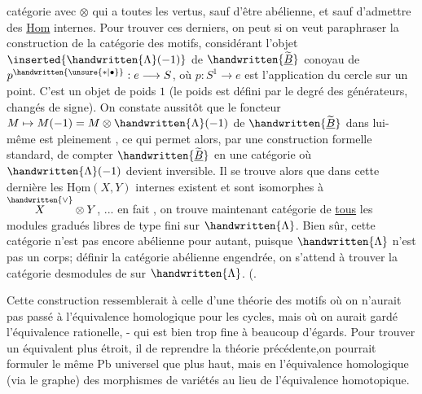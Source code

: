 
catégorie  avec $\otimes$ qui a toutes les vertus, sauf d'être abélienne, et sauf d'admettre des \uline{Hom} internes. Pour trouver ces derniers, on peut si on veut paraphraser la construction de la catégorie des motifs,    considérant l'objet $\inserted{\handwritten{\Lambda}(-1)}$ de $\handwritten{\widetilde{\underline B}}$ conoyau de $p^{\handwritten{\unsure{*|\bullet}}}:e\longrightarrow S$, où $p:S^1\longrightarrow e$ est l'application du cercle sur un point. C'est un objet de poids $1$ (le poids est défini par le degré  des générateurs, changés de signe). On constate aussitôt que le foncteur $M\mapsto M(-1)=M\otimes\handwritten{\Lambda}(-1)$ de $\handwritten{\widetilde{\underline B}}$ dans lui-même est pleinement , ce qui permet alors, par une construction formelle standard, de compter $\handwritten{\widetilde{\underline B}}$ en une catégorie où $\handwritten{\Lambda}(-1)$ devient inversible. Il se trouve alors que dans cette dernière les $\underline{\mathrm{Hom}}(X,Y)$ internes existent et  sont isomorphes à $\overset{\handwritten{\vee}}X\otimes Y$, ... en fait , on trouve maintenant  catégorie de \uline{tous} les modules gradués libres de type fini sur $\handwritten{\Lambda}$. Bien sûr, cette catégorie n'est pas encore abélienne pour autant, puisque $\handwritten{\Lambda}$ n'est pas un corps;  définir la catégorie abélienne engendrée, on s'attend à trouver la catégorie desmodules de    sur $\handwritten{\Lambda}$. (.

Cette construction ressemblerait à celle d'une théorie des motifs où on n'aurait pas passé à l'équivalence homologique pour les cycles, mais où on aurait gardé l'équivalence rationelle, - qui est bien trop fine à beaucoup d'égards. Pour trouver un équivalent plus étroit, il  de reprendre la théorie précédente,on pourrait formuler le même Pb universel que plus haut, mais en  l'équivalence homologique (via le graphe) des morphismes de variétés au lieu de l'équivalence homotopique. 

